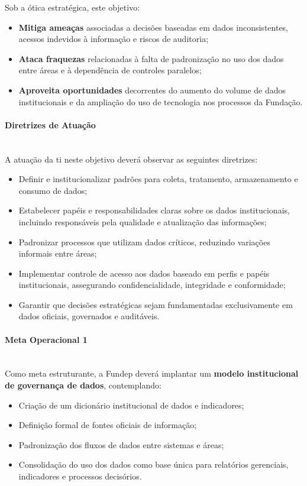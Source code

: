 \documentclass[12pt,a4paper]{article}
\begin{document}
Sob a ótica estratégica, este objetivo:
\begin{itemize}
  \item \textbf{Mitiga ameaças} associadas a decisões baseadas em dados inconsistentes, acessos indevidos à informação e riscos de auditoria;
  \item \textbf{Ataca fraquezas} relacionadas à falta de padronização no uso dos dados entre áreas e à dependência de controles paralelos;
  \item \textbf{Aproveita oportunidades} decorrentes do aumento do volume de dados institucionais e da ampliação do uso de tecnologia nos processos da Fundação.
\end{itemize}

\paragraph{Diretrizes de Atuação}\mbox{}\\
A atuação da \gls{ti} neste objetivo deverá observar as seguintes diretrizes:

\begin{itemize}
  \item Definir e institucionalizar padrões para coleta, tratamento, armazenamento e consumo de dados;
  \item Estabelecer papéis e responsabilidades claras sobre os dados institucionais, incluindo responsáveis pela qualidade e atualização das informações;
  \item Padronizar processos que utilizam dados críticos, reduzindo variações informais entre áreas;
  \item Implementar controle de acesso aos dados baseado em perfis e papéis institucionais, assegurando confidencialidade, integridade e conformidade;
  \item Garantir que decisões estratégicas sejam fundamentadas exclusivamente em dados oficiais, governados e auditáveis.
\end{itemize}

\paragraph{Meta Operacional 1}\mbox{}\\
Como meta estruturante, a Fundep deverá implantar um \textbf{modelo institucional de governança de dados}, contemplando:

\begin{itemize}
  \item Criação de um dicionário institucional de dados e indicadores;
  \item Definição formal de fontes oficiais de informação;
  \item Padronização dos fluxos de dados entre sistemas e áreas;
  \item Consolidação do uso dos dados como base única para relatórios gerenciais, indicadores e processos decisórios.
\end{itemize}
\end{document}
